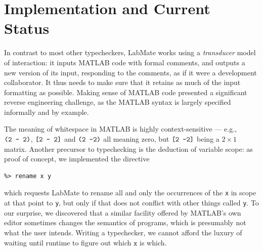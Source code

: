 \documentclass{IMEKO2024}
\newcommand{\isadd}[1]{#1\ \textsf{numeric}}
\newcommand{\ismult}[3]{(#1, #2, #3)\ \textsf{multipliable}}
\newcommand{\Matrix}[5]{\mathsf{Matrix}\,#1\,#2\,#3\,#4\,#5}
\newcommand{\remph}{\emph}
\begin{document}
%
%

%
%



\section{Implementation and Current Status}

In contrast to most other typecheckers, LabMate works using a
\remph{transducer} model of interaction: it inputs MATLAB code with
formal comments, and outputs a new version of its input, responding to
the comments, as if it were a development collaborator.  It thus needs
to make sure that it retains as much of the input formatting as
possible.  Making sense of MATLAB code presented a significant reverse
engineering challenge, as the MATLAB syntax is largely specified
informally and by example.

The meaning of whitespace in MATLAB is highly context-sensitive --- e.g., $\mbox{\texttt{(2 - 2)}}$, $\mbox{\texttt{[2 - 2]}}$ and $\mbox{\texttt{(2 -2)}}$ all meaning zero, but $\mbox{\texttt{[2 -2]}}$ being a $2\times1$ matrix.
%
Another precursor to typechecking is the deduction of variable scope: as proof of concept, we implemented the directive
\begin{verbatim}
%> rename x y
\end{verbatim}
which requests LabMate to rename all and only the occurrences of the \texttt{x} in scope at that point to \texttt{y}, but only if that does not conflict with other things called \texttt{y}.
%
To our surprise, we discovered that a similar facility offered by MATLAB's own editor sometimes changes the semantics of programs, which is presumably not what the user intends.
%
Writing a typechecker, we cannot afford the luxury of waiting until runtime to figure out which $\texttt{x}$ is which.
\end{document}
